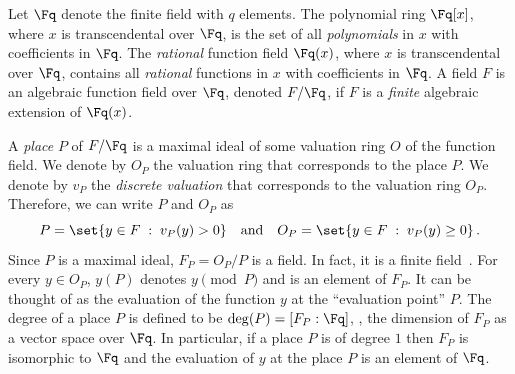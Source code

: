 Let $\Fq $ denote the finite field with $q$ elements. The polynomial
ring $\Fq [x]$, where $x$ is transcendental over $\Fq $, is the set
of all \emph{polynomials} in $x$ with coefficients in $\Fq $. The
\emph{rational} function field $\Fq (x)$, where $x$ is
transcendental over $\Fq $, contains all \emph{rational} functions
in $x$ with coefficients in $\Fq $. A field $F$ is an algebraic
function field over $\Fq$, denoted $F/\Fq $, if $F$ is a
\emph{finite} algebraic extension of $\Fq (x)$.

A \emph{place} $P$ of $F/\Fq $ is a maximal ideal of some valuation
ring $O$ of the function field. We denote by $O_P$ the valuation
ring that corresponds to the place $P$. We denote by $v_P$ the
\emph{discrete valuation} that corresponds to the valuation ring
$O_P$. Therefore, we can write $P$ and $O_P$ as $$P=\set{y \in F \;:\;
v_P(y)  >0}\quad\text{and}\quad O_P=\set{y \in F \;:\; v_P(y) \ge
0}\,.$$ Since $P$ is a maximal ideal, $F_P=O_P/P$ is a field. In fact,
it is a finite field~\cite[Proposition I.1.14]{S:93}. For every $y
\in O_P$, $y(P)$ denotes $y \pmod P$ and is an element of $F_P$. It
can be thought of as the evaluation of the function $y$ at the
``evaluation point'' $P$. The degree of a place $P$ is defined to be
$\deg(P)=[F_P:\Fq ]$, \ie, the dimension of $F_P$ as a vector space
over $\Fq$. In particular, if a place $P$ is of degree $1$ then
$F_P$ is isomorphic to $\Fq$ and the evaluation of $y$ at the place
$P$ is an element of $\Fq$.

